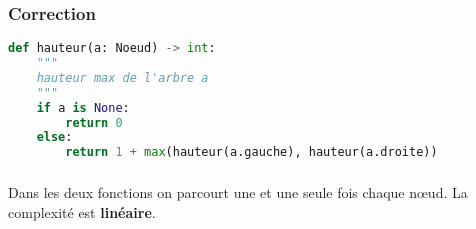 \documentclass[svgnames,11pt]{beamer}
\begin{document}
\begin{frame}[fragile]
    \frametitle{Correction}

\begin{center}
\begin{lstlisting}[language=Python , basicstyle=\ttfamily\small, xleftmargin=.2em, xrightmargin=-4em]
def hauteur(a: Noeud) -> int:
    """
    hauteur max de l'arbre a
    """
    if a is None:
        return 0
    else:
        return 1 + max(hauteur(a.gauche), hauteur(a.droite))
\end{lstlisting}
\label{CODE}
\end{center}   

\end{frame}
\begin{frame}
    \frametitle{}

    Dans les deux fonctions on parcourt une et une seule fois chaque nœud. La complexité est \textbf{linéaire}.

\end{frame}
\end{document}
